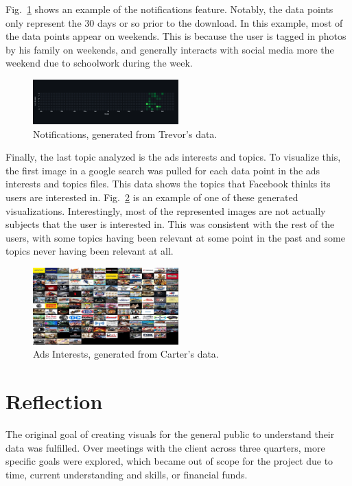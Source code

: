 \documentclass[conference, letterpaper, 11pt]{IEEEtran}
\begin{document}
Fig.~\ref{fig:ntf} shows an example of the notifications feature. Notably, the data points only represent the 30 days or so prior to the download. In this example, most of the data points appear on weekends. This is because the user is tagged in photos by his family on weekends, and generally interacts with social media more the weekend due to schoolwork during the week.

\begin{figure}[htbp]
    \centering
    \includegraphics[width=0.5\textwidth]{img/ntf.png}
    \caption{Notifications, generated from Trevor's data.}
    \label{fig:ntf}
\end{figure}

Finally, the last topic analyzed is the ads interests and topics. To visualize this, the first image in a google search was pulled for each data point in the ads interests and topics files. This data shows the topics that Facebook thinks its users are interested in. Fig.~\ref{fig:tps} is an example of one of these generated visualizations. Interestingly, most of the represented images are not actually subjects that the user is interested in. This was consistent with the rest of the users, with some topics having been relevant at some point in the past and some topics never having been relevant at all.

\begin{figure}[htbp]
    \centering
    \includegraphics[width=0.5\textwidth]{img/tps.png}
    \caption{Ads Interests, generated from Carter's data.}
    \label{fig:tps}
\end{figure}

\section{Reflection} \label{RE}
The original goal of creating visuals for the general public to understand their data was fulfilled. Over meetings with the client across three quarters, more specific goals were explored, which became out of scope for the project due to time, current understanding and skills, or financial funds.
\end{document}
